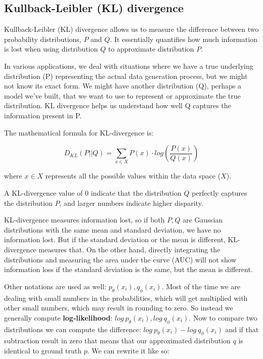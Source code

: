 \subsection{Kullback-Leibler (KL) divergence}
\label{appendix:kl_divergence}

Kullback-Leibler (KL) divergence allows us to measure the difference between two probability distributions, $P$ and $Q$. It essentially quantifies how much information is lost when using distribution $Q$ to approximate distribution $P$.

In various applications, we deal with situations where we have a true underlying distribution (P) representing the actual data generation process, but we might not know its exact form. We might have another distribution (Q), perhaps a model we've built, that we want to use to represent or approximate the true distribution. KL divergence helps us understand how well Q captures the information present in P.

The mathematical formula for KL-divergence is:

\begin{equation}
\label{eq:kl-divergence}
    D_{KL}(P || Q) = \sum_{x \in X} P(x) \cdot log(\frac{P(x)}{Q(x)})
\end{equation}

where $x \in X$ represents all the possible values within the data space ($X$).

A KL-divergence value of 0 indicate that the distribution $Q$ perfectly captures the distribution $P$, and larger numbers indicate higher disparity.

KL-divergence measures information lost, so if both $P,Q$ are Gaussian distributions with the same mean and standard deviation, we have no information lost. But if the standard deviation or the mean is different, KL-divergence measures that. On the other hand, directly integrating the distributions and measuring the area under the curve (AUC) will not show information loss if the standard deviation is the same, but the mean is different.


Other notations are used as well: $p_\theta(x_i), q_\phi(x_i)$. Most of the time we are dealing with small numbers in the probabilities, which will get multiplied with other small numbers, which may result in rounding to zero. So instead we generally compute \textbf{log-likelihood}: $log\ p_\theta(x_i), log\ q_\phi(x_i)$. Now to compare two distributions we can compute the difference: $log\ p_\theta(x_i) - log\ q_\phi(x_i)$ and if that subtraction result in zero that means that our approximated distribution $q$ is identical to ground truth $p$. We can rewrite it like so: 

